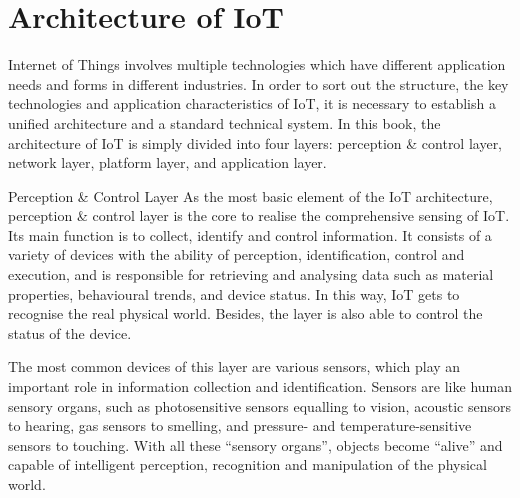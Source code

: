 \documentclass[a4paper,12pt]{book}
\begin{document}
\section{Architecture of IoT}

Internet of Things involves multiple technologies which have different application needs and forms in different industries. In order to sort out the structure, the key technologies and application characteristics of IoT, it is necessary to establish a unified architecture and a standard technical system. In this book, the architecture of IoT is simply divided into four layers: perception \& control layer, network layer, platform layer, and application layer.

\begin{term}{Perception \& Control Layer}
    As the most basic element of the IoT architecture, perception \& control layer is the core to realise the comprehensive sensing of IoT. Its main function is to collect, identify and control information. It consists of a variety of devices with the ability of perception, identification, control and execution, and is responsible for retrieving and analysing data such as material properties, behavioural trends, and device status. In this way, IoT gets to recognise the real physical world. Besides, the layer is also able to control the status of the device.

    \parskip 6pt
    The most common devices of this layer are various sensors, which play an important role in information collection and identification. Sensors are like human sensory organs, such as photosensitive sensors equalling to vision, acoustic sensors to hearing, gas sensors to smelling, and pressure- and temperature-sensitive sensors to touching. With all these “sensory organs”, objects become “alive” and capable of intelligent perception, recognition and manipulation of the physical world.
\end{term}
\end{document}

